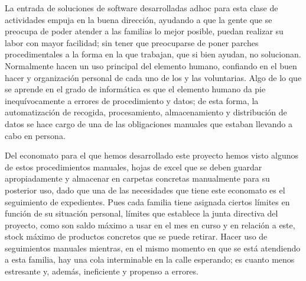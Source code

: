 \par La entrada de soluciones de software desarrolladas adhoc para esta clase de actividades empuja en la buena dirección, ayudando a que la gente que se preocupa de poder atender a las familias lo mejor posible, puedan realizar su labor con mayor facilidad; sin tener que preocuparse de poner parches procedimentales a la forma en la que trabajan, que si bien ayudan, no solucionan. Normalmente hacen un uso principal del elemento humano, confiando en el buen hacer y organización personal de cada uno de los y las voluntarias. Algo de lo que se aprende en el grado de informática es que el elemento humano da pie inequívocamente a errores de procedimiento y datos; de esta forma, la automatización de recogida, procesamiento, almacenamiento y distribución de datos se hace cargo de una de las obligaciones manuales que estaban llevando a cabo en persona.
\par Del economato para el que hemos desarrollado este proyecto hemos visto algunos de estos procedimientos manuales, hojas de excel que se deben guardar apropiadamente y almacenar en carpetas concretas manualmente para su posterior uso, dado que una de las necesidades que tiene este economato es el seguimiento de expedientes. Pues cada familia tiene asignada ciertos límites en función de su situación personal, límites que establece la junta directiva del proyecto, como son saldo máximo a usar en el mes en curso y en relación a este, stock máximo de productos concretos que se puede retirar. Hacer uso de seguimientos manuales mientras, en el mismo momento en que se está atendiendo a esta familia, hay una cola interminable en la calle esperando; es cuanto menos estresante y, además, ineficiente y propenso a errores.
 
